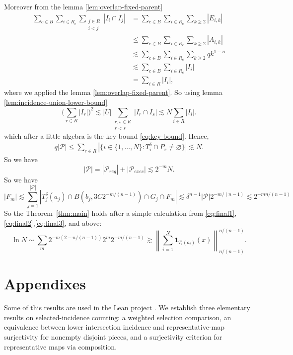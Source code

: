 \documentclass[11pt, letterpaper]{nyjm}
\begin{document}
Moreover from the lemma \ref{lem:overlap-fixed-parent} 
\begin{align*}
	\sum_{c \in B}\sum_{i\in R_c}\sum_{\substack{j\in R\\ i <j}} |I_i\cap I_j|  &= 
	\sum_{c\in B}\sum_{i\in R_c}
	\sum_{k\ge2}|E_{i,k}| \\
	&\leq 
	\sum_{c\in B}\sum_{i\in R_c}
	\sum_{k\ge2}|A_{i,k}| \\
	&\lesssim \sum_{c\in B}\sum_{i\in R_c}
	\sum_{k\ge2}qk^{1-n} \\
	&\lesssim \sum_{c \in B}\sum_{i \in R_c}|I_i|  \\
	&= \sum_{i \in R}|I_i|
	,
\end{align*}
where we applied the lemma \ref{lem:overlap-fixed-parent}. 
So using lemma \ref{lem:incidence-union-lower-bound} 
\[ 
\bigl(\sum_{r\in R}|I_r|\bigr)^2 \lesssim |U|\sum_{\substack{r,s\in R\\r<s}}|I_r\cap I_s| \lesssim N\sum_{i \in R}|I_i|. 	 
\]
which after a little algebra is the key bound \eqref{eq:key-bound}.  
Hence,
\[
\begin{aligned}
	q|\mathcal P|
	\leq  \sum_{r \in R}|\{i\in\{1,\ldots,N\}: T_i^\delta\cap P_r\ne\varnothing\}| 
	\lesssim N.
\end{aligned}
\]
	So we have 
	\[
	|\mathcal P| = |\mathcal P_{reg}| + |\mathcal P_{exec}| \lesssim 2^{-m}N.
	\]
	So we have 
	\begin{equation}
		|F_m| \lesssim \sum_ {j=1}^{|\mathcal P|}|T^\delta_j(a_j) \cap B(b_{j},3C2^{-m/(n-1)}) \cap G_j \cap F_m| \lesssim \delta^{n-1}|\mathcal P|2^{-m/(n-1)} \lesssim 2^{-mn/(n-1)} 
	\end{equation}
	So the Theorem~\ref{thm:main} holds after a simple calculation from \eqref{eq:final1}, \eqref{eq:final2},\eqref{eq:final3}, and above:
	\[
	\ln N \sim \sum_m 2^{-m(2-n/(n-1))} 2^{m}2^{-m/(n-1)}
	\gtrsim \left\| \sum_{i=1}^{N} \mathbf{1}_{T_i(a_i)}(x)
	\right\|_{n/(n-1)}^{n/(n-1)}.
	\] 
	
	\section{Appendixes}
	\appendix
	Some of this results are used in the Lean project \cite{Aspegren2026Lean}.
	We establish three elementary results on selected-incidence counting: a weighted selection comparison, an equivalence between lower intersection incidence and representative-map surjectivity for nonempty disjoint pieces, and a surjectivity criterion for representative maps via composition. 
	
\end{document}
